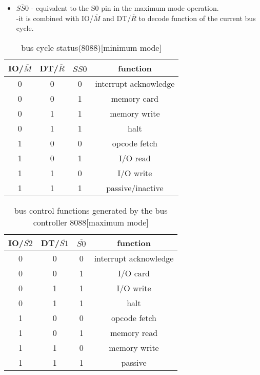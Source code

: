 \documentclass[12pt]{article}
\begin{document}
\begin{itemize}
\begin{itemize}
		\item\textbf{$\overline{SS0}$} - equivalent to the S0 pin in the maximum mode operation.\\
		-it is combined with IO/$\overline{M}$ and DT/$\overline{R}$ to decode function of the current bus cycle.
		  
	\end{itemize}  

	\begin{table}[H]
		\centering
		\begin{tabular}{|c|c|c|c|}
			\hline
			IO/$\overline{M}$ & DT/$\overline{R}$ & $\overline{SS0}$ & \textbf{function}\\\hline
			
			0 & 0 & 0 & interrupt acknowledge\\\hline
			0 & 0 & 1 & memory card\\\hline
			0 & 1 & 1 & memory write\\\hline
			0 & 1 & 1 & halt\\\hline
			1 & 0 & 0 & opcode fetch\\\hline
			1 & 0 & 1 & I/O read\\\hline
			1 & 1 & 0 & I/O write\\\hline
			1 & 1 & 1 & passive/inactive\\\hline
		\end{tabular}
		\caption{bus cycle status(8088)[minimum mode]}
	\end{table}

		\begin{table}[H]
		\centering
		\begin{tabular}{|c|c|c|c|}
			\hline
			IO/$\overline{S2}$ & DT/$\overline{S1}$ & $\overline{S0}$ & \textbf{function}\\\hline
			
			0 & 0 & 0 & interrupt acknowledge\\\hline
			0 & 0 & 1 & I/O card\\\hline
			0 & 1 & 1 & I/O write\\\hline
			0 & 1 & 1 & halt\\\hline
			1 & 0 & 0 & opcode fetch\\\hline
			1 & 0 & 1 & memory read\\\hline
			1 & 1 & 0 & memory write\\\hline
			1 & 1 & 1 & passive\\\hline
		\end{tabular}
		\caption{bus control functions generated by the bus controller 8088[maximum mode]}
	\end{table}
\end{itemize}
\end{document}
